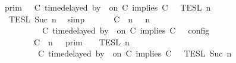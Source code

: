 \begin{isabellebody}
\ \ \ \ \ \ \ \ \ {\isacharequal}\ {\isasymlbrakk}{\isasymlbrakk}\ {\isasymGamma}\ {\isasymrbrakk}{\isasymrbrakk}\isactrlsub p\isactrlsub r\isactrlsub i\isactrlsub m\ {\isasyminter}\ {\isasymlbrakk}{\isasymlbrakk}\ {\isacharparenleft}C\ time{\isacharminus}delayed\ by\ {\isasymdelta}{\isasymtau}\ on\ C\ implies\ C\ {\isacharhash}\ {\isasymPsi}\ {\isasymrbrakk}{\isasymrbrakk}\isactrlsub T\isactrlsub E\isactrlsub S\isactrlsub L\isactrlbsup {\isasymge}\ n\isactrlesup \isanewline
\ \ \ \ \ \ \ \ \ \ {\isasyminter}\ {\isasymlbrakk}{\isasymlbrakk}\ {\isasymPhi}\ {\isasymrbrakk}{\isasymrbrakk}\isactrlsub T\isactrlsub E\isactrlsub S\isactrlsub L\isactrlbsup {\isasymge}\ Suc\ n\isactrlesup {\isacartoucheclose}\ \isamarkupfalse%
\ simp\isanewline
\ \ \isamarkupfalse%
\ \isamarkupfalse%
\ {\isacartoucheopen}{\isasymlbrakk}\ {\isacharparenleft}{\isacharparenleft}C\ {\isasymnot}{\isasymUp}\ n{\isacharparenright}\ {\isacharhash}\ {\isasymGamma}{\isacharparenright}{\isacharcomma}\ n\isanewline
\ \ \ \ \ \ \ \ \ \ \ \ \ \ \ \ \ \ {\isasymTurnstile}\ {\isasymPsi}\ {\isasymtriangleright}\ {\isacharparenleft}{\isacharparenleft}C\ time{\isacharminus}delayed\ by\ {\isasymdelta}{\isasymtau}\ on\ C\ implies\ C\ {\isacharhash}\ {\isasymPhi}{\isacharparenright}\ {\isasymrbrakk}\isactrlsub c\isactrlsub o\isactrlsub n\isactrlsub f\isactrlsub i\isactrlsub g\isanewline
\ \ \ \ \ \ \ \ \ \ \ \ \ \ \ \ \ {\isacharequal}\ {\isasymlbrakk}{\isasymlbrakk}\ {\isacharparenleft}C\ {\isasymnot}{\isasymUp}\ n{\isacharparenright}\ {\isacharhash}\ {\isasymGamma}\ {\isasymrbrakk}{\isasymrbrakk}\isactrlsub p\isactrlsub r\isactrlsub i\isactrlsub m\ {\isasyminter}\ {\isasymlbrakk}{\isasymlbrakk}\ {\isasymPsi}\ {\isasymrbrakk}{\isasymrbrakk}\isactrlsub T\isactrlsub E\isactrlsub S\isactrlsub L\isactrlbsup {\isasymge}\ n\isactrlesup \isanewline
\ \ \ \ \ \ \ \ \ \ \ \ \ \ \ \ \ \ {\isasyminter}\ {\isasymlbrakk}{\isasymlbrakk}\ {\isacharparenleft}C\ time{\isacharminus}delayed\ by\ {\isasymdelta}{\isasymtau}\ on\ C\ implies\ C\ {\isacharhash}\ {\isasymPhi}\ {\isasymrbrakk}{\isasymrbrakk}\isactrlsub T\isactrlsub E\isactrlsub S\isactrlsub L\isactrlbsup {\isasymge}\ Suc\ n\isactrlesup {\isacartoucheclose}\isanewline

\end{isabellebody}
